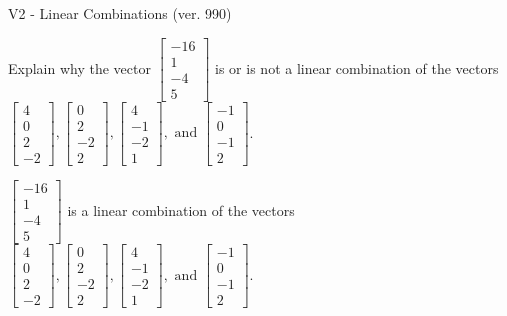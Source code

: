 \begin{exercise}
  \begin{exerciseTitle}V2 - Linear Combinations (ver. 990)\end{exerciseTitle}
  \begin{exerciseStatement}
    Explain why the vector \(\left[\begin{array}{c}
-16 \\
1 \\
-4 \\
5
\end{array}\right]\)  is or is not a linear 
	combination of the vectors \(\left[\begin{array}{c}
4 \\
0 \\
2 \\
-2
\end{array}\right] , \left[\begin{array}{c}
0 \\
2 \\
-2 \\
2
\end{array}\right] , \left[\begin{array}{c}
4 \\
-1 \\
-2 \\
1
\end{array}\right] , \text{ and } \left[\begin{array}{c}
-1 \\
0 \\
-1 \\
2
\end{array}\right]\).
	


  \end{exerciseStatement}
  \begin{exerciseAnswer}
   \(\left[\begin{array}{c}
-16 \\
1 \\
-4 \\
5
\end{array}\right]\) 
  	 is  
	a linear combination of the vectors \(\left[\begin{array}{c}
4 \\
0 \\
2 \\
-2
\end{array}\right] , \left[\begin{array}{c}
0 \\
2 \\
-2 \\
2
\end{array}\right] , \left[\begin{array}{c}
4 \\
-1 \\
-2 \\
1
\end{array}\right] , \text{ and } \left[\begin{array}{c}
-1 \\
0 \\
-1 \\
2
\end{array}\right]\).


\end{exerciseAnswer}
\end{exercise}
